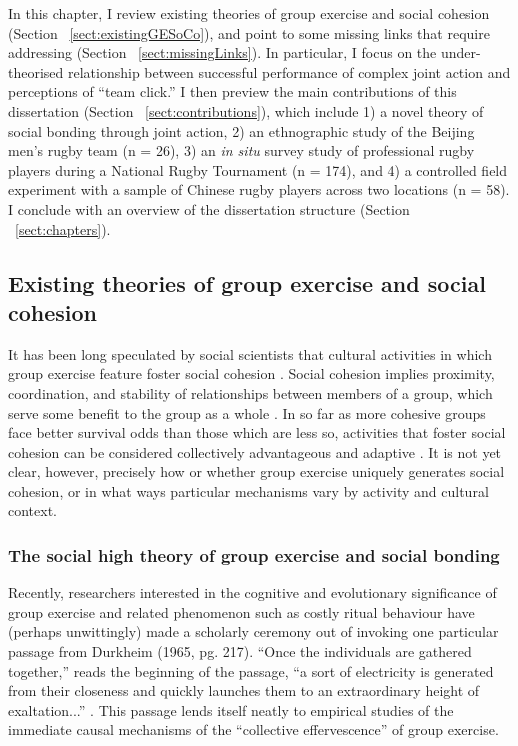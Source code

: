\begin{CJK}{UTF8}{gbsn}
In this chapter, I review existing theories of group exercise and social cohesion (Section ~\ref{sect:existingGESoCo}), and point to some missing links that require addressing (Section ~\ref{sect:missingLinks}). In particular, I focus on the under-theorised relationship between successful performance of complex joint action and perceptions of ``team click.''  I then preview the main contributions of this dissertation (Section ~\ref{sect:contributions}), which include 1) a novel theory of social bonding through joint action, 2) an ethnographic study of the Beijing men's rugby team (n = 26), 3) an \textit{in situ} survey study of professional rugby players during a National Rugby Tournament (n = 174), and 4) a controlled field experiment with a sample of Chinese rugby players across two locations (n = 58).  I conclude with an overview of the dissertation structure (Section ~\ref{sect:chapters}).

\subsection{Existing theories of group exercise and social cohesion\label{sect:existingGESoCo}}
It has been long speculated by social scientists \citep[see, for example][]{Durkheim1965} that cultural activities in which group exercise feature foster social cohesion \citep{Dunbar2010,Whitehouse2004}.  Social cohesion implies proximity, coordination, and stability of relationships between members of a group, which serve some benefit to the group as a whole \citep{Taylor2018}.  In so far as more cohesive groups face better survival odds than those which are less so, activities that foster social cohesion can be considered collectively advantageous and adaptive \citep{Dunbar2010}.  It is not yet clear, however, precisely how or whether group exercise uniquely generates social cohesion, or in what ways particular mechanisms vary by activity and cultural context.

\subsubsection{The social high theory of group exercise and social bonding \label{sect:socialHigh}}
Recently, researchers interested in the cognitive and evolutionary significance of group exercise and related phenomenon such as costly ritual behaviour have (perhaps unwittingly) made a scholarly ceremony out of invoking one particular passage from Durkheim (1965, pg. 217).  ``Once the individuals are gathered together,'' reads the beginning of the passage, ``a sort of electricity is generated from their closeness and quickly launches them to an extraordinary height of exaltation...'' \citep[see ][]{McNeill1995,Konvalinka2011,Fischer2014,Mogan2017}. This passage lends itself neatly to empirical studies of the immediate causal mechanisms of the ``collective effervescence'' of group exercise.


\end{CJK}
